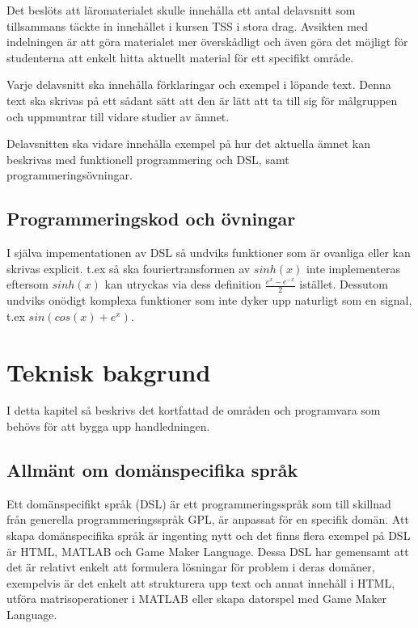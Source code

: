 \documentclass[]{article}
\begin{document}
Det beslöts att läromaterialet skulle innehålla ett antal delavsnitt som
tillsammans täckte in innehållet i kursen TSS i stora drag.
Avsikten med indelningen är att göra materialet mer överskådligt och
även göra det möjligt för studenterna att enkelt hitta aktuellt material
för ett specifikt område.

Varje delavsnitt ska innehålla förklaringar och exempel i löpande text.
Denna text ska skrivas på ett sådant sätt att den är lätt att ta till
sig för målgruppen och uppmuntrar till vidare studier av ämnet.

Delavsnitten ska vidare innehålla exempel på hur det aktuella ämnet kan
beskrivas med funktionell programmering och DSL, samt programmeringsövningar.

\subsection{Programmeringskod och övningar}

I själva impementationen av DSL så undviks funktioner som är
ovanliga eller kan skrivas explicit. t.ex så ska fouriertransformen av
$sinh(x)$ inte implementeras eftersom $sinh(x)$ kan utryckas via dess
definition $\frac{e^{x} - e^{-x}}{2}$ istället.
Dessutom undviks onödigt komplexa funktioner som inte
dyker upp naturligt som en signal, t.ex $sin(cos(x)+e^x)$.

\section{Teknisk bakgrund}
I detta kapitel så beskrivs det kortfattad de områden och programvara som
behövs för att bygga upp handledningen.

\subsection{Allmänt om domänspecifika språk}
Ett domänspecifikt språk (\gls{DSL}) är ett programmeringsspråk som till
skillnad från generella programmeringsspråk \gls{GPL}, är anpassat för en
specifik domän. Att skapa domänspecifika språk är ingenting nytt och det
finns flera exempel på DSL är HTML, MATLAB och Game Maker Language.
Dessa DSL har gemensamt att det är relativt enkelt att formulera lösningar för
problem i deras domäner, exempelvis är det enkelt att strukturera upp text och
annat innehåll i HTML, utföra matrisoperationer i MATLAB eller skapa datorspel
med Game Maker Language.
\end{document}
